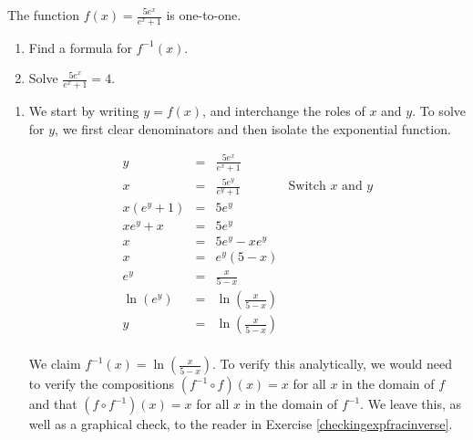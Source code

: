 \documentclass{ximera}
\begin{document}
\begin{example}  \label{expfracinverse} The function $f(x) = \frac{5e^{x}}{e^{x}+1}$ is one-to-one. 

\begin{enumerate}

\item Find a formula for $f^{-1}(x)$.

\item  Solve $\frac{5e^{x}}{e^{x}+1} = 4$.

\end{enumerate}


\begin{explanation} \begin{enumerate} \item We start by writing $y=f(x)$, and interchange the roles of $x$ and $y$.  To solve for $y$, we first clear denominators and then isolate the exponential function.

\[ \begin{array}{rclr}
y & = & \frac{5e^{x}}{e^{x}+1} & \\  
x & = & \frac{5e^{y}}{e^{y}+1} & \text{Switch $x$ and $y$} \\  
x \left(e^{y}+1\right) & = & 5e^{y} & \\  
x e^{y}+x & = & 5e^{y} & \\  
x & = & 5e^{y} - x e^{y} & \\  
x & = & e^{y}(5 - x) & \\  
e^{y}& = & \frac{x}{5-x} & \\ 
\ln\left(e^{y}\right) & = & \ln\left(\frac{x}{5-x}\right) & \\ 
y & = & \ln\left(\frac{x}{5-x}\right) & \\
\end{array}\]

We claim $f^{-1}(x) = \ln\left(\frac{x}{5-x}\right)$.  To verify this analytically, we would need to verify the compositions $\left(f^{-1} \circ f\right)(x) = x$ for all $x$ in the domain of $f$ and that $\left(f \circ f^{-1}\right)(x) = x$ for all $x$ in the domain of $f^{-1}$.   We leave this, as well as a graphical check, to the reader in Exercise \ref{checkingexpfracinverse}.



\end{enumerate}
\end{explanation}
\end{example}
\end{document}
